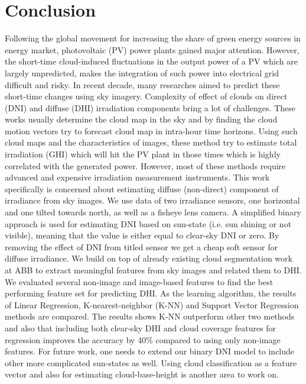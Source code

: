 \chapter{Conclusion}
Following the global movement for increasing the share of green energy sources in energy market, photovoltaic (PV) power plants gained major attention. However, the short-time cloud-induced fluctuations in the output power of a PV which are largely unpredicted, makes the integration of such power into electrical grid difficult and risky. In recent decade, many researches aimed to predict these short-time changes using sky imagery. Complexity of effect of clouds on direct (DNI) and diffuse (DHI) irradiation components bring a lot of challenges. These works usually determine the cloud map in the sky and by finding the cloud motion vectors try to forecast cloud map in intra-hour time horizons. Using such cloud maps and the characteristics of images, these method try to estimate total irradiation (GHI) which will hit the PV plant in those times which is highly correlated with the generated power. However, most of these methods require advanced and expensive irradiation measurement instruments.
\newline
This work specifically is concerned about estimating diffuse (non-direct) component of irradiance from sky images. We use data of two irradiance sensors, one horizontal and one tilted towards north, as well as a fisheye lens camera. A simplified binary approach is used for estimating DNI based on sun-state (i.e. sun shining or not visible), meaning that the value is either equal to clear-sky DNI or zero. By removing the effect of DNI from titled sensor we get a cheap soft sensor for diffuse irradiance. We build on top of already existing cloud segmentation work at ABB to extract meaningful features from sky images and related them to DHI. We evaluated several non-image and image-based features to find the best performing feature set for predicting DHI. As the learning algorithm, the results of Linear Regression, K-nearest-neighbor (K-NN) and Support Vector Regression methods are compared. The results shows K-NN outperform other two methods and also that including both clear-sky DHI and cloud coverage features for regression improves the accuracy by 40\% compared to using only non-image features. 
\newline
For future work, one needs to extend our binary DNI model to include other more complicated sun-states as well. Using cloud classification as a feature vector and also for estimating cloud-base-height is another area to work on.